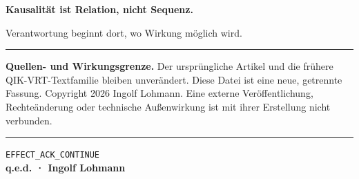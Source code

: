 \documentclass[11pt,a4paper]{article}
\newcommand{\code}[1]{\texttt{#1}}
\begin{document}
\clearpage
\vspace*{\fill}
\begin{center}
\begin{minipage}{0.78\textwidth}
\begin{center}
{\Large\bfseries Kausalität ist Relation, nicht Sequenz.}\par
\vspace{0.45em}
{\large Verantwortung beginnt dort, wo Wirkung möglich wird.}
\end{center}
\vspace{0.9em}\hrule\vspace{0.9em}
{\small\noindent\textbf{Quellen- und Wirkungsgrenze.}
Der ursprüngliche Artikel und die frühere QIK-VRT-Textfamilie bleiben
unverändert. Diese Datei ist eine neue, getrennte Fassung. Copyright
\textcopyright{} 2026 Ingolf Lohmann. Eine externe Veröffentlichung,
Rechteänderung oder technische Außenwirkung ist mit ihrer Erstellung nicht
verbunden.\par}
\vspace{0.9em}\hrule\vspace{0.9em}
\begin{center}
\code{EFFECT\_ACK\_CONTINUE}\\[0.8em]
\textbf{q.e.d. · Ingolf Lohmann}
\end{center}
\end{minipage}
\end{center}
\vspace*{\fill}
\end{document}

